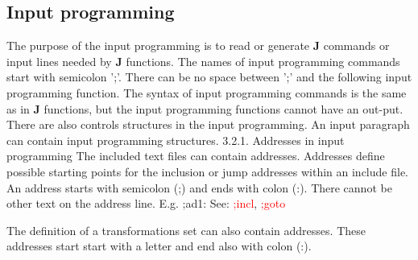 \subsection{Input programming}
\label{inpuprog}
 The purpose of the input programming is to read or generate \textbf{J} commands or input lines
 needed by \textbf{J} functions. The names of input programming commands start with semicolon ';'.
 There can be no space between ';' and the following input programming function. The syntax
 of input programming commands is the same as in \textbf{J} functions, but the input programming
 functions cannot have an out-put. There are also controls structures in the input programming.
 An input paragraph can contain input programming structures.
 3.2.1. Addresses in input programming
 The included text files can contain addresses. Addresses define possible starting points for the
 inclusion or jump addresses within an include file. An address starts with semicolon (;) and
 ends with colon (:). There cannot be other text on the address line. E.g.
 ;ad1:
 See: \textcolor{Red}{;incl}, \textcolor{Red}{;goto}
\begin{note}
The definition of a transformations set can also contain addresses. These addresses start start
 with a letter and end also with colon (:).
\end{note}
